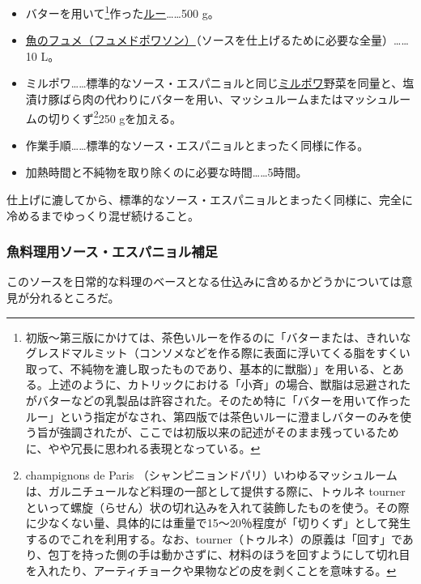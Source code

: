 \begin{recette}
\begin{itemize}
\item
  バターを用いて\footnote{初版〜第三版にかけては、茶色いルーを作るのに「バターまたは、きれいなグレスドマルミット（コンソメなどを作る際に表面に浮いてくる脂をすくい取って、不純物を漉し取ったものであり、基本的に獣脂）」を用いる、とある。上述のように、カトリックにおける「小斉」の場合、獣脂は忌避されたがバターなどの乳製品は許容された。そのため特に「バターを用いて作ったルー」という指定がなされ、第四版では茶色いルーに澄ましバターのみを使う旨が強調されたが、ここでは初版以来の記述がそのまま残っているために、やや冗長に思われる表現となっている。}作った\protect\hyperlink{roux-brun}{ルー}\ldots{}\ldots{}500
  g。
\item
  \protect\hyperlink{fumet-de-poisson}{魚のフュメ（フュメドポワソン）}（ソースを仕上げるために必要な全量）\ldots{}\ldots{}10
  L。
\item
  ミルポワ\ldots{}\ldots{}標準的なソース・エスパニョルと同じ\protect\hyperlink{mirepoix}{ミルポワ}野菜を同量と、塩漬け豚ばら肉の代わりにバターを用い、マッシュルームまたはマッシュルームの切りくず\footnote{champignons
    de Paris
    （シャンピニョンドパリ）いわゆるマッシュルームは、ガルニチュールなど料理の一部として提供する際に、トゥルネ
    tourner
    といって螺旋（らせん）状の切れ込みを入れて装飾したものを使う。その際に少なくない量、具体的には重量で15〜20％程度が「切りくず」として発生するのでこれを利用する。なお、tourner（トゥルネ）の原義は「回す」であり、包丁を持った側の手は動かさずに、材料のほうを回すようにして切れ目を入れたり、アーティチョークや果物などの皮を剥くことを意味する。}250
  gを加える。
\item
  作業手順\ldots{}\ldots{}標準的なソース・エスパニョルとまったく同様に作る。
\item
  加熱時間と不純物を取り除くのに必要な時間\ldots{}\ldots{}5時間。
\end{itemize}

仕上げに漉してから、標準的なソース・エスパニョルとまったく同様に、完全に冷めるまでゆっくり混ぜ続けること。

\atoaki{}

\hypertarget{observation-sauce-espagnole-maigre}{%
\subsubsection{魚料理用ソース・エスパニョル補足}\label{observation-sauce-espagnole-maigre}}

このソースを日常的な料理のベースとなる仕込みに含めるかどうかについては意見が分れるところだ。


\end{recette}
